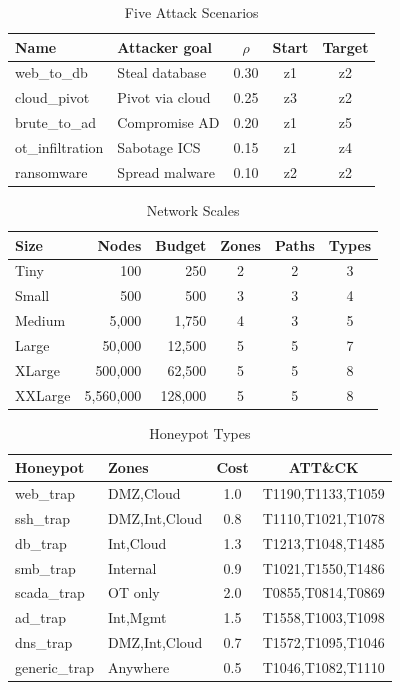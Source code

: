 \documentclass[journal]{IEEEtran}
\begin{document}
\begin{table}[htbp]
\caption{Five Attack Scenarios}
\label{tab:paths}
\centering\renewcommand{\arraystretch}{1.2}
\begin{tabular}{@{}llccc@{}}
\toprule
\textbf{Name}&\textbf{Attacker goal}&$\rho$&\textbf{Start}&\textbf{Target}\\
\midrule
web\_to\_db&Steal database&0.30&z1&z2\\
cloud\_pivot&Pivot via cloud&0.25&z3&z2\\
brute\_to\_ad&Compromise AD&0.20&z1&z5\\
ot\_infiltration&Sabotage ICS&0.15&z1&z4\\
ransomware&Spread malware&0.10&z2&z2\\
\bottomrule
\end{tabular}
\end{table}

\begin{table}[htbp]
\caption{Network Scales}
\label{tab:scales}
\centering\renewcommand{\arraystretch}{1.2}
\begin{tabular}{@{}lrrccc@{}}
\toprule
\textbf{Size}&\textbf{Nodes}&\textbf{Budget}&\textbf{Zones}&\textbf{Paths}&\textbf{Types}\\
\midrule
Tiny&100&250&2&2&3\\
Small&500&500&3&3&4\\
Medium&5{,}000&1{,}750&4&3&5\\
Large&50{,}000&12{,}500&5&5&7\\
XLarge&500{,}000&62{,}500&5&5&8\\
XXLarge&5{,}560{,}000&128{,}000&5&5&8\\
\bottomrule
\end{tabular}
\end{table}

\begin{table}[htbp]
\caption{Honeypot Types}
\label{tab:profiles}
\centering\renewcommand{\arraystretch}{1.2}
\begin{tabular}{@{}llcc@{}}
\toprule
\textbf{Honeypot}&\textbf{Zones}&\textbf{Cost}&\textbf{ATT\&CK}\\
\midrule
web\_trap&DMZ,Cloud&1.0&T1190,T1133,T1059\\
ssh\_trap&DMZ,Int,Cloud&0.8&T1110,T1021,T1078\\
db\_trap&Int,Cloud&1.3&T1213,T1048,T1485\\
smb\_trap&Internal&0.9&T1021,T1550,T1486\\
scada\_trap&OT only&2.0&T0855,T0814,T0869\\
ad\_trap&Int,Mgmt&1.5&T1558,T1003,T1098\\
dns\_trap&DMZ,Int,Cloud&0.7&T1572,T1095,T1046\\
generic\_trap&Anywhere&0.5&T1046,T1082,T1110\\
\bottomrule
\end{tabular}
\end{table}
\end{document}
